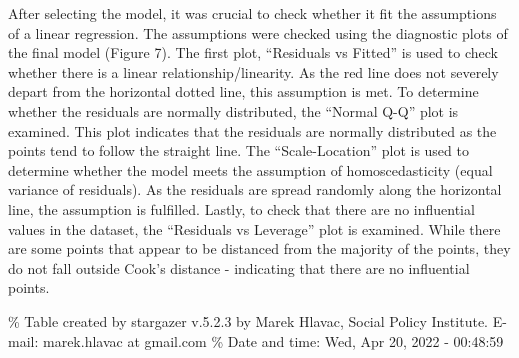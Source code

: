 \documentclass[
  12pt,
]{article}
\begin{document}
After selecting the model, it was crucial to check whether it fit the
assumptions of a linear regression. The assumptions were checked using
the diagnostic plots of the final model (Figure 7). The first plot,
``Residuals vs Fitted'' is used to check whether there is a linear
relationship/linearity. As the red line does not severely depart from
the horizontal dotted line, this assumption is met. To determine whether
the residuals are normally distributed, the ``Normal Q-Q'' plot is
examined. This plot indicates that the residuals are normally
distributed as the points tend to follow the straight line. The
``Scale-Location'' plot is used to determine whether the model meets the
assumption of homoscedasticity (equal variance of residuals). As the
residuals are spread randomly along the horizontal line, the assumption
is fulfilled. Lastly, to check that there are no influential values in
the dataset, the ``Residuals vs Leverage'' plot is examined. While there
are some points that appear to be distanced from the majority of the
points, they do not fall outside Cook's distance - indicating that there
are no influential points.

\% Table created by stargazer v.5.2.3 by Marek Hlavac, Social Policy
Institute. E-mail: marek.hlavac at gmail.com \% Date and time: Wed, Apr
20, 2022 - 00:48:59
\end{document}
